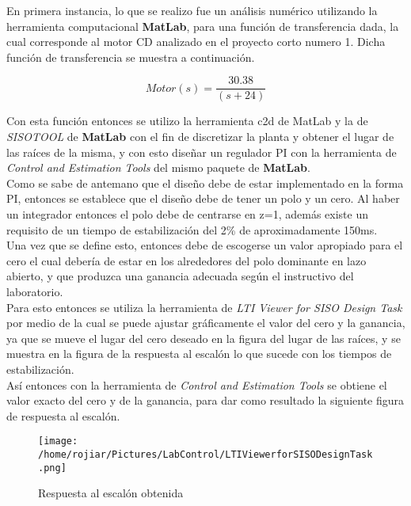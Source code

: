 \documentclass[a4paper,10pt,twocolumn]{article}
\begin{document}
En primera instancia, lo que se realizo fue un análisis numérico utilizando la herramienta computacional \textbf{MatLab}, para una función de 
transferencia dada, la cual corresponde al motor CD analizado en el proyecto corto numero 1. Dicha función de transferencia se muestra
a continuación. 

\begin{center}
$$
 Motor(s) = \frac{30.38}{(s+24)}
$$
\end{center}

Con esta función entonces se utilizo la herramienta c2d de MatLab y la de \textit{SISOTOOL} de \textbf{MatLab} con el fin de discretizar la planta y
obtener el lugar de las raíces de la misma, y con esto diseñar un regulador PI con la herramienta de \textit{Control and Estimation Tools} 
del mismo paquete de \textbf{MatLab}.\\

Como se sabe de antemano que el diseño debe de estar implementado en la forma PI, entonces se establece que el diseño debe de tener 
un polo y un cero. Al haber un integrador entonces el polo debe de centrarse en z=1, además existe un requisito de un tiempo de estabilización
del 2\% de aproximadamente 150ms.\\

Una vez que se define esto, entonces debe de escogerse un valor apropiado para el cero el cual debería de estar en los alrededores del polo
dominante en lazo abierto, y que produzca una ganancia adecuada según el instructivo del laboratorio.\\

Para esto entonces se utiliza la herramienta de \textit{LTI Viewer for SISO Design Task} por medio de la cual se puede ajustar gráficamente
el valor del cero y la ganancia, ya que se mueve el lugar del cero deseado en la figura del lugar de las raíces, y se muestra en la figura de
la respuesta al escalón lo que sucede con los tiempos de estabilización.\\

Así entonces con la herramienta de \textit{Control and Estimation Tools} se obtiene el valor exacto del cero y de la ganancia, para dar como
resultado la siguiente figura de respuesta al escalón.

\newpage

\begin{figure}[h!]
\centering
\texttt{[image: /home/rojiar/Pictures/LabControl/LTIViewerforSISODesignTask.png]}
\caption{Respuesta al escalón obtenida}
\label{Respuesta al escalon obtenida}
\end{figure}
\end{document}
